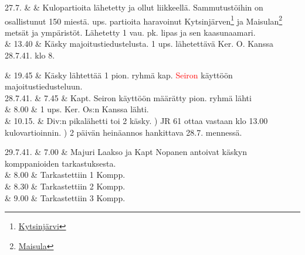 \documentclass[11pt,a5paper,oneside]{book}
\begin{document}
27.7. & & Kulopartioita lähetetty ja ollut liikkeellä. Sammutustöihin on osallistunut 150 miestä.  ups. partioita haravoinut Kytsinjärven\footnote{\href{https://www.google.fi/maps/place/Kyutsin\%22Yarvi/@61.7953543,31.557194,16z/}{Kytsinjärvi}} ja Maisulan\footnote{\href{https://www.google.fi/maps/place/61\%C2\%B051'34.2\%22N+31\%C2\%B034'17.4\%22E/}{Maisula}} metsät ja ympäristöt. Lähetetty 1 vau. pk. lipas ja sen kaasunaamari. \newline\newline \\

& 13.40 & Käsky majoitustiedustelusta. 1 ups. lähetettävä Ker. O. Kanssa 28.7.41. klo 8. \\
\newpage

& 19.45 & Käsky lähtettää 1 pion. ryhmä kap. \textcolor{red}{Seiron} käyttöön majoitustiedusteluun. \newline\newline\newline\newline\newline \\

28.7.41. & 7.45 & Kapt. Seiron käyttöön määrätty pion. ryhmä lähti \newline \\

& 8.00 & 1 ups. Ker. Os:n Kanssa lähti. \\

& 10.15. & Div:n pikalähetti toi 2 käsky. ) JR 61 ottaa vastaan klo 13.00 kulovartioinnin. ) 2 päivän heinäannos hankittava 28.7. mennessä. \\

\taulustop


29.7.41. & 7.00 & Majuri Laakso ja Kapt Nopanen antoivat käskyn komppanioiden tarkastuksesta. \\

& 8.00 & Tarkastettiin 1 Kompp. \\

& 8.30 & Tarkastettiin 2 Kompp. \\

& 9.00 & Tarkastettiin 3 Kompp. \\
\end{document}
